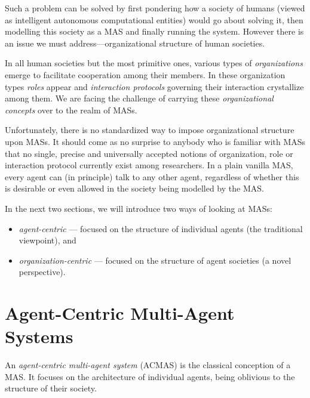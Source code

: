 Such a problem can be solved by first pondering how a society of humans (viewed as intelligent autonomous computational entities) would go about solving it, then modelling this society as a MAS and finally running the system.
However there is an issue we must address---organizational structure of human societies.

In all human societies but the most primitive ones, various types of \textit{organizations} emerge to facilitate cooperation among their members.
In these organization types \textit{roles} appear and \textit{interaction protocols} governing their interaction crystallize among them.
We are facing the challenge of carrying these \textit{organizational concepts} over to the realm of MASs.

Unfortunately, there is no standardized way to impose organizational structure upon MASs.
It should come as no surprise to anybody who is familiar with MASs that no single, precise and universally accepted notions of organization, role or interaction protocol currently exist among researchers.
In a plain vanilla MAS, every agent can (in principle) talk to any other agent, regardless of whether this is desirable or even allowed in the society being modelled by the MAS.

In the next two sections, we will introduce two ways of looking at MASs:
\begin{itemize}
	\item \textit{agent-centric} --- focused on the structure of individual agents (the traditional viewpoint), and
	\item \textit{organization-centric} --- focused on the structure of agent societies (a novel perspective).
\end{itemize}

\section{Agent-Centric Multi-Agent Systems}

An \textit{agent-centric multi-agent system} (ACMAS) is the classical conception of a MAS.
It focuses on the architecture of individual agents, being oblivious to the structure of their society.

